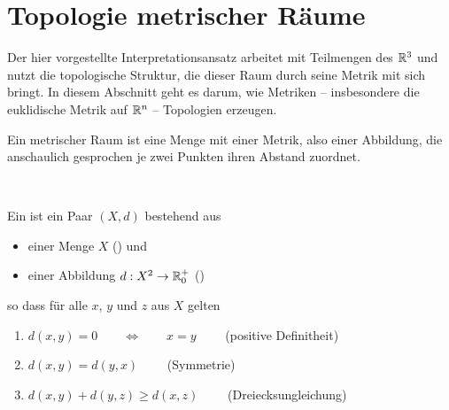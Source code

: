     


\section{Topologie metrischer Räume}\label{sec:top-metr-raeume}

    Der hier vorgestellte Interpretationsansatz arbeitet mit Teilmengen des $\mathbb{R}^3$ und nutzt die topologische Struktur, die dieser Raum durch seine Metrik mit sich bringt.
    In diesem Abschnitt geht es darum, wie Metriken -- insbesondere die euklidische Metrik auf $\mathbb{R}^n$ -- Topologien erzeugen.
    
    Ein
    metrischer Raum ist eine Menge mit einer Metrik, also einer Abbildung, die anschaulich gesprochen je zwei Punkten ihren Abstand zuordnet.
    \begin{dfn}\label{def:metr}\ \vspace{8pt}

        \noindent
        Ein  ist ein Paar $(X,d)$ bestehend aus
        \begin{itemize}
            \item einer Menge $X$ () und
            \item einer Abbildung $ d: X^2 \rightarrow \mathbb{R}_0^+$ ()
        \end{itemize}
        so dass für alle $x$, $y$ und $z$ aus $X$ gelten
        \begin{enumerate}
            \item $d(x,y) = 0 \quad \quad \Leftrightarrow \quad \quad x=y \qquad$ (positive Definitheit) 
            \item $d(x,y) = d(y,x) \qquad$ (Symmetrie)
            \item $d(x,y) + d(y,z) \geq d(x,z) \qquad$ (Dreiecksungleichung)
        \end{enumerate}
    \end{dfn}


